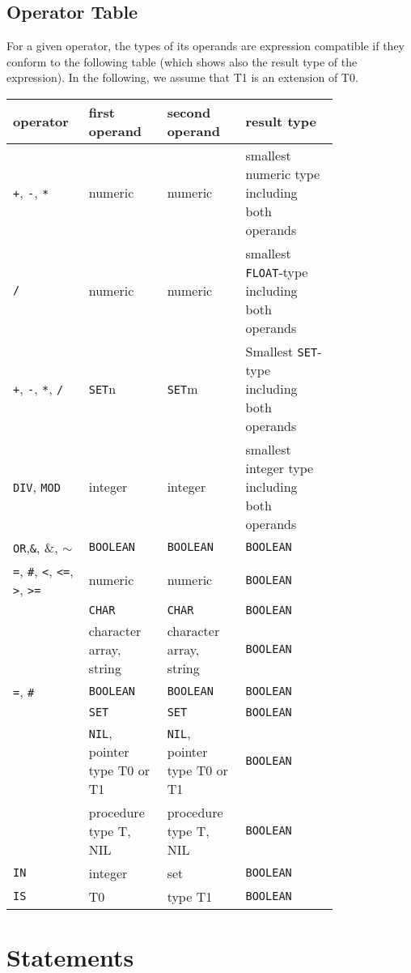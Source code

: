 \documentclass[a4wide,11pt]{article}
\newcommand{\DIV}{\lstinline"DIV"}
\newcommand{\MOD}{\lstinline"MOD"}
\newcommand{\IN}{\lstinline"IN"}
\newcommand{\IS}{\lstinline"IS"}
\newcommand{\NIL}{\lstinline"NIL"}
\newcommand{\CHAR}{\lstinline"CHAR"}
\newcommand{\FLOAT}{\lstinline"FLOAT"}
\newcommand{\BOOLEAN}{\lstinline"BOOLEAN"}
\newcommand{\SET}{\lstinline"SET"}
\begin{document}
\subsection{Operator Table}\label{section:OperatoTable}
For a given operator, the types of its operands are expression compatible if they conform to the following table (which shows also the result type of the expression).
In the following, we assume that T1 is an extension of T0.

\begin{longtable}{p{0.15\linewidth}p{0.2\linewidth}p{0.2\linewidth}p{0.25\linewidth}}
operator & first operand & second operand & result type \\ \hline
\lstinline$+$, \lstinline$-$, \lstinline$*$ &  numeric & numeric & smallest numeric type including both operands\\
\lstinline$/$ & numeric & numeric & smallest \FLOAT-type including both operands\\
\lstinline$+$, \lstinline$-$, \lstinline"*", \lstinline"/" & \SET{n} & \SET{m} & Smallest \SET-type including both operands\\
\DIV, \MOD & integer & integer & smallest integer type including both operands\\
\lstinline"OR",\lstinline"&", \&, $\sim$ & \BOOLEAN & \BOOLEAN & \BOOLEAN\\
\lstinline"=", \lstinline"#", \lstinline"<", \lstinline"<=", \lstinline">", \lstinline">=" & numeric & numeric & \BOOLEAN\\
& \CHAR & \CHAR & \BOOLEAN\\
& character array, string & character array, string& \BOOLEAN\\
\lstinline$=$, \lstinline$#$ & \BOOLEAN & \BOOLEAN & \BOOLEAN\\
& \SET & \SET & \BOOLEAN\\
& \NIL, pointer type T0 or T1 & \NIL, pointer type T0 or T1 & \BOOLEAN \\
& procedure type T, NIL & procedure type T, NIL &  \BOOLEAN\\
\IN & integer & set & \BOOLEAN \\
\IS & T0 & type T1 & \BOOLEAN
\end{longtable}

\section{Statements}
\end{document}
